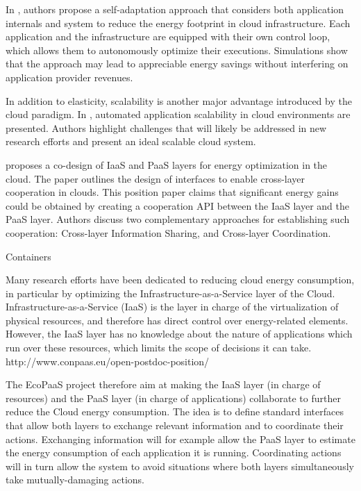 In \cite{de_oliveira_self-management_2012}, authors propose a self-adaptation approach that considers both application internals and system to reduce the energy footprint in cloud infrastructure. Each application and the infrastructure are equipped with their own control loop, which allows them to autonomously optimize their executions. Simulations show that the approach may lead to appreciable energy savings without interfering on application provider revenues.

In addition to elasticity, scalability is another major advantage introduced by the cloud paradigm. In \cite{vaquero_dynamically_2011}, automated application scalability in cloud environments are presented. Authors highlight challenges that will likely be addressed in new research efforts and present an ideal scalable cloud system.


\cite{carpen-amarie_towards_2014} proposes a co-design of IaaS and PaaS layers for energy optimization in the cloud. The paper outlines the design of interfaces to enable cross-layer cooperation in clouds. This position paper claims that significant energy gains could be obtained by creating a cooperation API between the IaaS layer and the PaaS layer. Authors discuss two complementary approaches for establishing such cooperation: Cross-layer Information Sharing, and Cross-layer Coordination.

Containers


Many research efforts have been dedicated to reducing cloud energy consumption, in particular by optimizing the Infrastructure-as-a-Service layer of the Cloud. Infrastructure-as-a-Service (IaaS) is the layer in charge of the virtualization of physical resources, and therefore has direct control over energy-related elements. However, the IaaS layer has no knowledge about the nature of applications which run over these resources, which limits the scope of decisions it can take.
http://www.conpaas.eu/open-postdoc-position/

The EcoPaaS project therefore aim at making the IaaS layer (in charge of resources) and the PaaS layer (in charge of applications) collaborate to further reduce the Cloud energy consumption. The idea is to define standard interfaces that allow both layers to exchange relevant information and to coordinate their actions. Exchanging information will for example allow the PaaS layer to estimate the energy consumption of each application it is running. Coordinating actions will in turn allow the system to avoid situations where both layers simultaneously take mutually-damaging actions.

